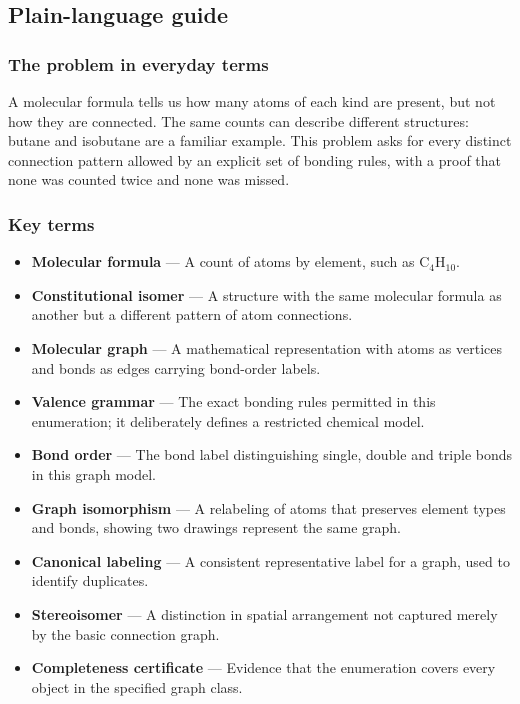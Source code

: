 \documentclass[
  11pt,
]{article}
\newcounter{none} %
\begin{document}
\subsection{Plain-language guide}

\subsubsection{The problem in everyday terms}

A molecular formula tells us how many atoms of each kind are present,
but not how they are connected. The same counts can describe different
structures: butane and isobutane are a familiar example. This problem
asks for every distinct connection pattern allowed by an explicit set of
bonding rules, with a proof that none was counted twice and none was
missed.

\subsubsection{Key terms}

\begin{itemize}
\item
  \textbf{Molecular formula} --- A count of atoms by element, such as
  C\ensuremath{{}_{4}}H\ensuremath{{}_{10}}.
\item
  \textbf{Constitutional isomer} --- A structure with the same molecular
  formula as another but a different pattern of atom connections.
\item
  \textbf{Molecular graph} --- A mathematical representation with atoms
  as vertices and bonds as edges carrying bond-order labels.
\item
  \textbf{Valence grammar} --- The exact bonding rules permitted in this
  enumeration; it deliberately defines a restricted chemical model.
\item
  \textbf{Bond order} --- The bond label distinguishing single, double
  and triple bonds in this graph model.
\item
  \textbf{Graph isomorphism} --- A relabeling of atoms that preserves
  element types and bonds, showing two drawings represent the same
  graph.
\item
  \textbf{Canonical labeling} --- A consistent representative label for
  a graph, used to identify duplicates.
\item
  \textbf{Stereoisomer} --- A distinction in spatial arrangement not
  captured merely by the basic connection graph.
\item
  \textbf{Completeness certificate} --- Evidence that the enumeration
  covers every object in the specified graph class.
\end{itemize}
\end{document}
